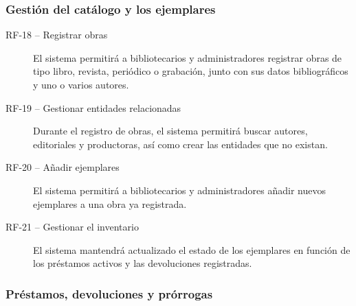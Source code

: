 \subsubsection{Gestión del catálogo y los ejemplares}

\begin{description}
	\item[RF-18 -- Registrar obras]
	El sistema permitirá a bibliotecarios y administradores registrar obras	de tipo libro, revista, periódico o grabación, junto con sus datos bibliográficos y uno o varios autores.
	
	\item[RF-19 -- Gestionar entidades relacionadas]
	Durante el registro de obras, el sistema permitirá buscar autores, editoriales y productoras, así como crear las entidades que no existan.
		
	\item[RF-20 -- Añadir ejemplares]
	El sistema permitirá a bibliotecarios y administradores añadir nuevos ejemplares a una obra ya registrada.
	
	\item[RF-21 -- Gestionar el inventario]
	El sistema mantendrá actualizado el estado de los ejemplares en función	de los préstamos activos y las devoluciones registradas.
\end{description}

\subsubsection{Préstamos, devoluciones y prórrogas}

